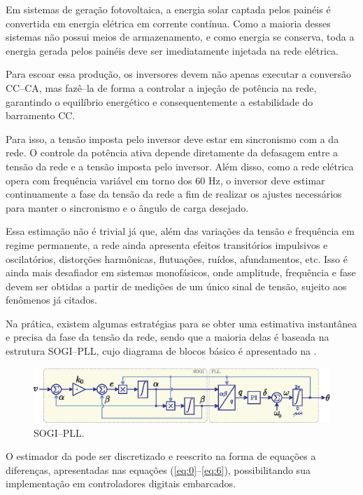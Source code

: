 \newcommand{\0}{_{_{\! n\!}}}
\newcommand{\1}{_{_{\! n\text{-}\!\>\!1\!}}}
\newcommand{\2}{_{_{\! n-\!2\!}}}
Em sistemas de geração fotovoltaica, a energia solar captada pelos painéis é convertida em energia elétrica em corrente contínua.
Como a maioria desses sistemas não possui meios de armazenamento, e como energia se conserva, toda a energia gerada
pelos painéis deve ser imediatamente injetada na rede elétrica.

Para escoar essa produção, os inversores devem não apenas executar a conversão CC--CA, mas fazê--la de forma
a controlar a injeção de potência na rede, garantindo o equilíbrio energético e consequentemente a estabilidade do
barramento CC.

Para isso, a tensão imposta pelo inversor deve estar em sincronismo com a da rede.
O controle da potência ativa depende diretamente da defasagem entre a tensão da rede e a tensão imposta pelo inversor.
Além disso, como a rede elétrica opera com frequência variável em torno dos 60 Hz, o inversor deve estimar
continuamente a fase da tensão da rede a fim de realizar os ajustes necessários para manter o sincronismo e o
ângulo de carga desejado.

Essa estimação não é trivial já que, além das variações da tensão e frequência em regime permanente, a rede ainda
apresenta efeitos transitórios impulsivos e oscilatórios, distorções harmônicas, flutuações, ruídos, afundamentos, etc.
Isso é ainda mais desafiador em sistemas monofásicos, onde amplitude, frequência e fase devem ser obtidas a partir de
medições de um único sinal de tensão, sujeito aos fenômenos já citados.

Na prática, existem algumas estratégias para se obter uma estimativa instantânea e precisa da fase da tensão da rede,
sendo que a maioria delas é baseada na estrutura SOGI--PLL, cujo diagrama de blocos básico é apresentado na .
\begin{figure}[htbp]
    \centering
    \includegraphics{figs/pll.eps}
    \caption{SOGI--PLL.}
    \label{fig:ex01}
\end{figure}



O estimador da  pode ser discretizado e reescrito na forma de equações a diferenças, apresentadas nas equações
(\ref{eq:0}--\ref{eq:6}), possibilitando sua implementação em controladores digitais embarcados.

